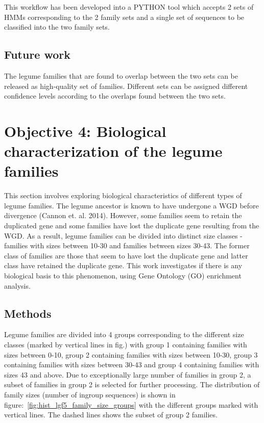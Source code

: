 \documentclass{article}
\begin{document}
		This workflow has been developed into a PYTHON tool which accepts 2 sets of HMMs corresponding to the 2 family sets and a single set of sequences to be classified into the two family sets.
		
		\subsection{Future work}
		The legume families that are found to overlap between the two sets can be released as high-quality set of families. Different sets can be assigned different confidence levels according to the overlaps found between the two sets.
	
	\pagebreak
	\section{Objective 4: Biological characterization of the legume families}
	This section involves exploring biological characteristics of different types of legume families. The legume ancestor is known to have undergone a WGD before divergence (Cannon et. al. 2014).  However, some families seem to retain the duplicated gene and some families have lost the duplicate gene resulting from the WGD. As a result, legume families can be divided into distinct size classes - families with sizes between 10-30 and families between sizes 30-43. The former class of families are those that seem to have lost the duplicate gene and latter class have retained the duplicate gene. This work investigates if there is any biological basis to this phenomenon, using Gene Ontology (GO) enrichment analysis. 
	
		\subsection{Methods}
		Legume families are divided into 4 groups corresponding to the different size classes (marked by vertical lines in fig.) with group 1 containing families with sizes between 0-10, group 2 containing families with sizes between 10-30, group 3 containing families with sizes between 30-43 and group 4 containing families with sizes 43 and above. Due to exceptionally large number of families in group 2, a subset of families in group 2 is selected for further processing. The distribution of family sizes (number of ingroup sequences) is shown in figure:~\ref{fig:hist_lgf5_family_size_groups} with the different groups marked with vertical lines. The dashed lines shows the subset of group 2 families.
		
\end{document}
